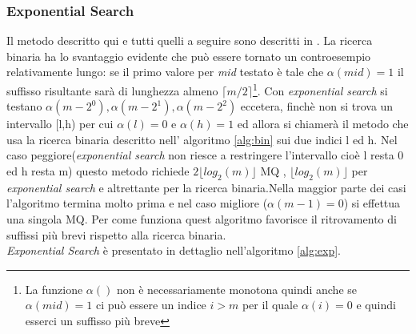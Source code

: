 \subsubsection{Exponential Search}
 Il metodo descritto qui e tutti quelli a seguire sono descritti in \cite{StefCounterexample14}.  La ricerca binaria ha lo svantaggio evidente che può essere tornato un  controesempio relativamente lungo: se il primo valore per \textit{mid} testato è tale che $\alpha(mid)=1$ il suffisso risultante sarà di lunghezza almeno   $\lceil m/2 \rceil$\footnote{La funzione $\alpha()$ non è necessariamente monotona quindi anche se $\alpha(mid)=1$ ci può essere un indice $i>m$ per il quale $\alpha(i)=0$ e quindi esserci un suffisso più breve}. Con \textit{exponential search}  si testano $\alpha(m-2^{0}),\alpha(m-2^{1}),\alpha(m-2^{2})$ eccetera, finchè non si trova un intervallo [l,h) per cui $\alpha(l)=0 \text{ e } \alpha(h)=1$ ed allora si chiamerà il metodo che usa la ricerca binaria descritto nell' algoritmo \ref{alg:bin} sui due indici l ed h. Nel caso peggiore(\textit{exponential search} non riesce a restringere l'intervallo cioè l resta 0 ed h resta m) questo metodo richiede $2\lfloor log_{2}(m) \rfloor$ \ac{MQ} , $\lfloor log_{2}(m)\rfloor$ per \textit{exponential search} e altrettante per la ricerca binaria.Nella maggior parte dei casi l'algoritmo termina molto prima e nel caso migliore ($\alpha(m-1)=0$) si effettua una singola \ac{MQ}. Per come funziona quest algoritmo favorisce il ritrovamento di suffissi più brevi rispetto alla ricerca binaria.\\
  \textit{Exponential Search} è presentato in dettaglio nell'algoritmo \ref{alg:exp}.
 
